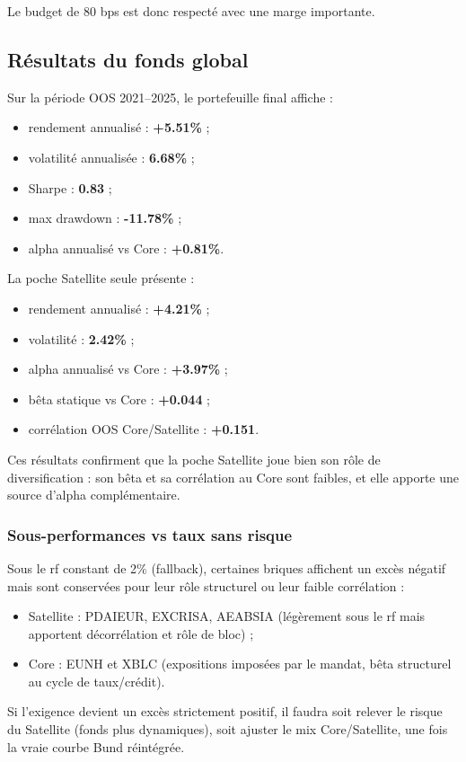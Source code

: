 \documentclass{article}
\begin{document}
Le budget de 80 bps est donc respecté avec une marge importante.

\subsection{Résultats du fonds global}

Sur la période OOS 2021--2025, le portefeuille final affiche :
\begin{itemize}
    \item rendement annualisé : \textbf{+5.51\%} ;
    \item volatilité annualisée : \textbf{6.68\%} ;
    \item Sharpe : \textbf{0.83} ;
    \item max drawdown : \textbf{-11.78\%} ;
    \item alpha annualisé vs Core : \textbf{+0.81\%}.
\end{itemize}

La poche Satellite seule présente :
\begin{itemize}
    \item rendement annualisé : \textbf{+4.21\%} ;
    \item volatilité : \textbf{2.42\%} ;
    \item alpha annualisé vs Core : \textbf{+3.97\%} ;
    \item bêta statique vs Core : \textbf{+0.044} ;
    \item corrélation OOS Core/Satellite : \textbf{+0.151}.
\end{itemize}

Ces résultats confirment que la poche Satellite joue bien son rôle de diversification : son bêta et sa corrélation au Core sont faibles, et elle apporte une source d’alpha complémentaire.

\subsubsection{Sous-performances vs taux sans risque}\label{sec:sousperf}
Sous le rf constant de 2\% (fallback), certaines briques affichent un excès négatif mais sont conservées pour leur rôle structurel ou leur faible corrélation :
\begin{itemize}
    \item Satellite : PDAIEUR, EXCRISA, AEABSIA (légèrement sous le rf mais apportent décorrélation et rôle de bloc) ;
    \item Core : EUNH et XBLC (expositions imposées par le mandat, bêta structurel au cycle de taux/crédit).
\end{itemize}
Si l’exigence devient un excès strictement positif, il faudra soit relever le risque du Satellite (fonds plus dynamiques), soit ajuster le mix Core/Satellite, une fois la vraie courbe Bund réintégrée.
\end{document}
